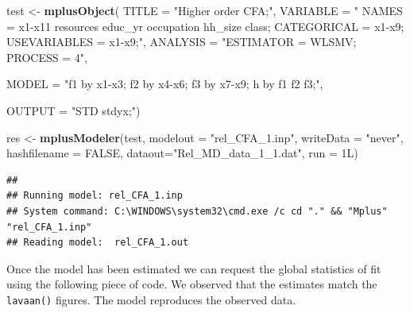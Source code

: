 \documentclass[]{book}
\newenvironment{Shaded}{\begin{snugshade}}{\end{snugshade}}
\newcommand{\DataTypeTok}[1]{\textcolor[rgb]{0.13,0.29,0.53}{#1}}
\newcommand{\KeywordTok}[1]{\textcolor[rgb]{0.13,0.29,0.53}{\textbf{#1}}}
\newcommand{\NormalTok}[1]{#1}
\newcommand{\OperatorTok}[1]{\textcolor[rgb]{0.81,0.36,0.00}{\textbf{#1}}}
\newcommand{\OtherTok}[1]{\textcolor[rgb]{0.56,0.35,0.01}{#1}}
\newcommand{\StringTok}[1]{\textcolor[rgb]{0.31,0.60,0.02}{#1}}
\begin{document}
\begin{Shaded}
\begin{Highlighting}[]
\NormalTok{test <-}\StringTok{ }\KeywordTok{mplusObject}\NormalTok{(}
\DataTypeTok{TITLE =} \StringTok{"Higher order CFA;"}\NormalTok{,}
   \DataTypeTok{VARIABLE =} \StringTok{"}
\StringTok{     NAMES = x1-x11 resources educ_yr occupation hh_size class;}
\StringTok{     CATEGORICAL = x1-x9;}
\StringTok{     USEVARIABLES = x1-x9;"}\NormalTok{,}
   \DataTypeTok{ANALYSIS =} \StringTok{"ESTIMATOR = WLSMV;}
\StringTok{              PROCESS = 4"}\NormalTok{,}

\DataTypeTok{MODEL =} \StringTok{"f1 by x1-x3;}
\StringTok{  f2 by x4-x6;}
\StringTok{  f3 by x7-x9;}
\StringTok{  h by f1 f2 f3;"}\NormalTok{,}

\DataTypeTok{OUTPUT =} \StringTok{"STD stdyx;"}\NormalTok{)}

\NormalTok{res <-}\StringTok{ }\KeywordTok{mplusModeler}\NormalTok{(test, }\DataTypeTok{modelout =} \StringTok{"rel_CFA_1.inp"}\NormalTok{,}
                    \DataTypeTok{writeData =} \StringTok{"never"}\NormalTok{,}
                    \DataTypeTok{hashfilename =} \OtherTok{FALSE}\NormalTok{,}
                    \DataTypeTok{dataout=}\StringTok{"Rel_MD_data_1_1.dat"}\NormalTok{, }\DataTypeTok{run =}\NormalTok{ 1L)}
\end{Highlighting}
\end{Shaded}

\begin{verbatim}
## 
## Running model: rel_CFA_1.inp 
## System command: C:\WINDOWS\system32\cmd.exe /c cd "." && "Mplus" "rel_CFA_1.inp" 
## Reading model:  rel_CFA_1.out
\end{verbatim}

Once the model has been estimated we can request the global statistics of fit using the following piece of code. We observed that the estimates match the \texttt{lavaan()} figures. The model reproduces the observed data.

\begin{Shaded}
\end{Shaded}
\end{document}
